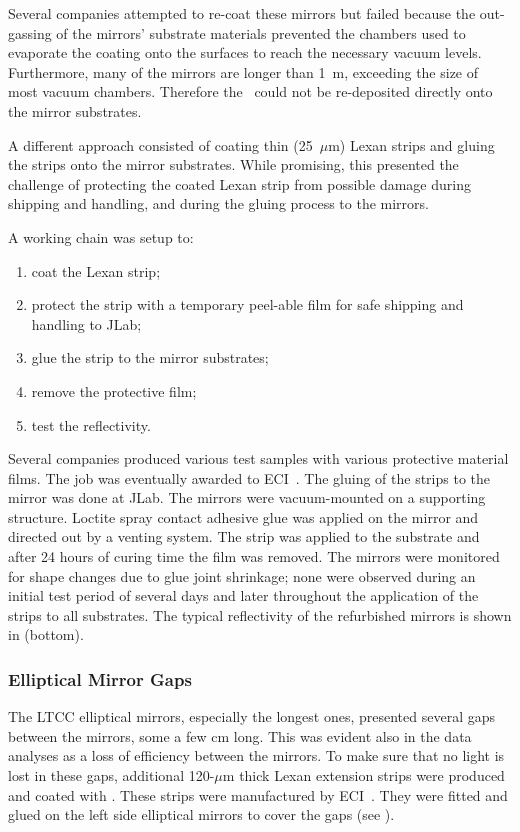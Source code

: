 Several companies attempted to re-coat these mirrors but failed because the out-gassing of the mirrors' substrate
materials prevented the chambers used to evaporate the coating onto the surfaces to reach the necessary vacuum
levels. Furthermore, many of the mirrors are longer than 1~m, exceeding the size of most vacuum chambers.
Therefore the \coating\ could not be re-deposited directly onto the mirror substrates.

A different approach consisted of coating thin (25~$\mu$m) Lexan strips and gluing the strips onto the mirror
substrates. While promising, this presented the challenge of protecting the coated Lexan strip from possible
damage during shipping and handling, and during the gluing process to the mirrors.

A working chain was setup to:

\begin{enumerate}
	\item coat the Lexan strip;
	\item protect the strip with a temporary peel-able film for safe shipping and handling to JLab;
	\item glue the strip to the mirror substrates;
	\item remove the protective film;
	\item test the reflectivity.
\end{enumerate}

Several companies produced various test samples with various protective material films. The job was eventually
awarded to ECI~\cite{ECI}. The gluing of the strips to the mirror was done at JLab. The mirrors were
vacuum-mounted on a supporting structure. Loctite spray contact adhesive glue was applied on the mirror and
directed out by a venting system. The strip was applied to the substrate and after 24 hours of curing time the film
was removed. The mirrors were monitored for shape changes due to glue joint shrinkage; none were observed during
an initial test period of several days and later throughout the application of the strips to all substrates.
The typical reflectivity of the refurbished mirrors is shown in  (bottom).

\subsubsection{Elliptical Mirror Gaps}

The LTCC elliptical mirrors, especially the longest ones, presented several gaps between the mirrors, some a few
cm long. This was evident also in the data analyses as a loss of efficiency between the mirrors. To make sure that
no light is lost in these gaps, additional 120-$\mu$m thick Lexan extension strips were produced and coated with
\coating. These strips were manufactured by ECI~\cite{ECI}. They were fitted and glued on the left side
elliptical mirrors to cover the gaps (see ).

